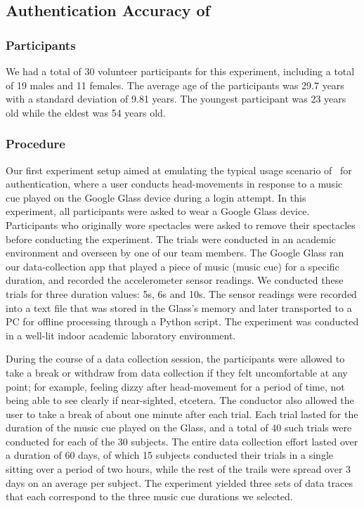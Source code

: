 \subsection{Authentication Accuracy of \systemname}

\subsubsection{Participants}
We had a total of 30 volunteer participants for this experiment, including a total of 19 males and 11 females.
The average age of the participants was 29.7 years with a standard deviation
of 9.81 years. The youngest participant was 23 years old while the eldest was
54 years old.

\subsubsection{Procedure}
Our first experiment setup aimed at emulating the typical usage scenario
of \systemname~for authentication, where a user conducts head-movements in
response to a music cue played on the Google Glass device during a login
attempt.
In this experiment, all participants were asked to wear a Google Glass
device. Participants who originally wore spectacles were asked to remove their
spectacles before conducting the experiment.
The trials were conducted in an academic environment and overseen by one of
our team members.
The Google Glass ran our data-collection app that played a piece of
music (music cue) for a specific duration, and recorded the accelerometer
sensor readings. We conducted these trials for three duration values: 5s,
6s and 10s. %
The sensor readings were recorded into a text file that was stored
in the Glass's memory and later transported to a PC for offline processing
through a Python script. The experiment was conducted in a well-lit indoor
academic laboratory environment.

During the course of a data collection session, the participants were allowed to take a
break or withdraw from data collection if they felt uncomfortable at any
point; for example, feeling
dizzy after head-movement for a period of time, not being able to see clearly
if near-sighted, etcetera. The conductor also allowed the user to take a break
of about one minute after each trial.
Each trial lasted for the duration of the music cue played on the Glass, and
a total of 40 such trials were conducted for each of the 30 subjects.
The entire data collection effort lasted over a duration of 60 days, of which 15
subjects conducted their trials in a single sitting over a period of two
hours, while the rest of the trails were spread over 3 days on an average per
subject.
The experiment yielded three sets of data traces that each correspond to
the three music cue durations we selected.


